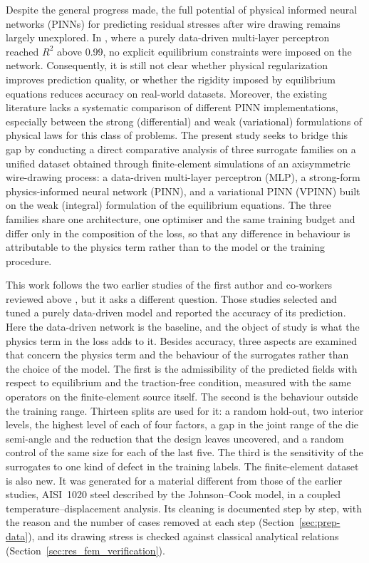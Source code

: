 \documentclass[pdflatex,sn-basic,Numbered]{sn-jnl}
\begin{document}
Despite the general progress made, the full potential of physical informed neural networks (PINNs) for predicting residual stresses after wire drawing remains largely unexplored. In \citep{demin2025forecasting}, where a purely data-driven multi-layer perceptron reached $R^2$ above 0.99, no explicit equilibrium constraints were imposed on the network.
Consequently, it is still not clear whether physical regularization improves prediction quality, or whether the rigidity imposed by equilibrium equations reduces accuracy on real-world datasets. Moreover, the existing literature lacks a systematic comparison of different PINN implementations, especially between the strong (differential) and weak (variational) formulations of physical laws for this class of problems.
The present study seeks to bridge this gap by conducting a direct comparative analysis of three surrogate families on a unified dataset obtained through finite-element simulations of an axisymmetric wire-drawing process: a data-driven multi-layer perceptron (MLP), a strong-form physics-informed neural network (PINN), and a variational PINN (VPINN) built on the weak (integral) formulation of the equilibrium equations. The three families share one architecture, one optimiser and the same training budget and differ only in the composition of the loss, so that any difference in behaviour is attributable to the physics term rather than to the model or the training procedure.

This work follows the two earlier studies of the first author and co-workers reviewed above \citep{demin2024application,demin2025forecasting}, but it asks a different question. Those studies selected and tuned a purely data-driven model and reported the accuracy of its prediction. Here the data-driven network is the baseline, and the object of study is what the physics term in the loss adds to it. Besides accuracy, three aspects are examined that concern the physics term and the behaviour of the surrogates rather than the choice of the model. The first is the admissibility of the predicted fields with respect to equilibrium and the traction-free condition, measured with the same operators on the finite-element source itself. The second is the behaviour outside the training range. Thirteen splits are used for it: a random hold-out, two interior levels, the highest level of each of four factors, a gap in the joint range of the die semi-angle and the reduction that the design leaves uncovered, and a random control of the same size for each of the last five. The third is the sensitivity of the surrogates to one kind of defect in the training labels. The finite-element dataset is also new. It was generated for a material different from those of the earlier studies, AISI~1020 steel described by the Johnson--Cook model, in a coupled temperature--displacement analysis. Its cleaning is documented step by step, with the reason and the number of cases removed at each step (Section~\ref{sec:prep-data}), and its drawing stress is checked against classical analytical relations (Section~\ref{sec:res_fem_verification}).
\end{document}
